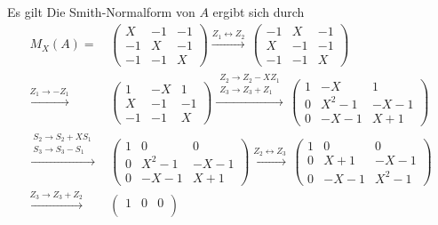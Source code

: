 \section{}

Es gilt
Die Smith-Normalform von $A$ ergibt sich durch
\begin{align*}
    M_X(A)
  =&\,
    \begin{pmatrix}
      X  & -1  & -1  \\
      -1  &  X  & -1  \\
      -1  & -1  &  X
    \end{pmatrix}
  \xrightarrow{Z_1 \leftrightarrow Z_2}\,
    \begin{pmatrix}
      -1  &  X  & -1  \\
       X  & -1  & -1  \\
      -1  & -1  &  X
    \end{pmatrix}
  \\
  \xrightarrow{Z_1 \to -Z_1}&\,
    \begin{pmatrix}
       1  & -X  &  1  \\
       X  & -1  & -1  \\
      -1  & -1  &  X
    \end{pmatrix}
  \xrightarrow{\substack{Z_2 \to Z_2 - X Z_1 \\ Z_3 \to Z_3 + Z_1}}\,
    \begin{pmatrix}
      1 &    -X   &    1  \\
      0 & X^2  -1 & -X-1  \\
      0 &    -X-1 &  X+1
    \end{pmatrix}
  \\
  \xrightarrow{\substack{S_2 \to S_2 + X S_1 \\ S_3 \to S_3 - S_1}}&\,
    \begin{pmatrix}
      1 &       0 &    0  \\
      0 & X^2  -1 & -X-1  \\
      0 &    -X-1 &  X+1
    \end{pmatrix}
  \xrightarrow{Z_2 \leftrightarrow Z_3}\,
    \begin{pmatrix}
      1 &    0  &        0  \\
      0 &  X+1  &     -X-1  \\
      0 & -X-1  &  X^2  -1
    \end{pmatrix}
  \\
  \xrightarrow{Z_3 \to Z_3 + Z_2}&\,
    \begin{pmatrix}
      1 &    0  &        0  \\

\end{pmatrix}
\end{align*}
